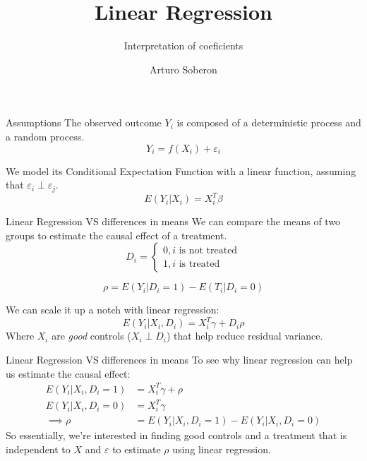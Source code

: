 \documentclass{clbeamer2024}
\title{\textbf{Linear Regression}}
\subtitle{Interpretation of coeficients}
\author{Arturo Soberon}
\institute{}
\date{}
\begin{document}
\setcounter{framenumber}{-1}
\frame{\titlepage}

\begin{frame}{Assumptions}
    The observed outcome $Y_i$ is composed of a deterministic process and a random process.
    \begin{equation}
        Y_i = f(X_i) + \varepsilon_i
    \end{equation}

    We model its Conditional Expectation Function with a linear function, assuming that $\varepsilon_i \perp \varepsilon_j$.
    \begin{equation}
        E(Y_i | X_i) = X_i^T \beta
    \end{equation}
\end{frame}

\begin{frame}{Linear Regression VS differences in means}
    We can compare the means of two groups to estimate the causal effect of a treatment.
    \begin{equation*}
        D_i = 
        \begin{cases}
            0, \text{$i$ is not treated} \\
            1, \text{$i$ is treated}
        \end{cases}
    \end{equation*}

    \begin{equation}
        \rho = E(Y_i | D_i = 1) - E(T_i | D_i = 0)
    \end{equation}

    We can scale it up a notch with linear regression:
    \begin{equation}
        E(Y_i | X_i, D_i) = X_i^T \gamma + D_i \rho 
    \end{equation}
    Where $X_i$ are \textit{good} controls ($X_i \perp D_i$) that help reduce residual variance.
\end{frame}

\begin{frame}{Linear Regression VS differences in means}
    To see why linear regression can help us estimate the causal effect:
    \begin{equation*}
    \begin{split}
        E(Y_i | X_i, D_i = 1) & = X_i^T \gamma + \rho \\
        E(Y_i | X_i, D_i = 0) & = X_i^T \gamma \\
        \implies \rho & = E(Y_i | X_i, D_i = 1) - E(Y_i | X_i, D_i = 0)
    \end{split}
    \end{equation*}
    So essentially, we're interested in finding good controls and a treatment that is independent to $X$ and $\varepsilon$ to estimate $\rho$ using linear regression.
\end{frame}
\end{document}
